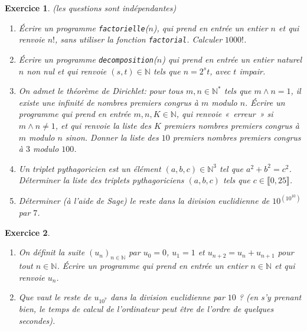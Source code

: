 \documentclass[11pt,a4paper]{article}
\newtheorem{ex}{Exercice}
\newcommand{\N}{\mathbb{N}}
\begin{document}
\begin{ex}(les   questions sont indépendantes)

\begin{enumerate}

\item Écrire un programme \texttt{factorielle}($n$), qui prend en entrée un entier $n$ et qui renvoie $n!$, sans utiliser la fonction \texttt{factorial}. Calculer $1000!$.



\item Écrire un programme \texttt{decomposition}($n$) qui prend en entrée un entier naturel $n$ non nul et qui renvoie $(s,t)\in \N$ tels que $n=2^s t$, avec $t$ impair.


\item On admet le théorème de Dirichlet: pour tous $m,n\in \N^*$ tels que $m\wedge n =1$, il existe une infinité de nombres premiers congrus à $m$ modulo $n$. Écrire un programme qui prend en entrée $m,n,K\in \N$, qui renvoie «~erreur~» si $m\wedge n\neq 1$, et qui renvoie la liste des $K$ premiers nombres premiers congrus à $m$ modulo $n$ sinon. Donner la liste des $10$ premiers nombres premiers congrus à $3$ modulo $100$.

\item Un triplet pythagoricien est un élément $(a,b,c)\in \N^3$ tel que $a^2+b^2=c^2$. Déterminer la liste des triplets pythagoriciens $(a,b,c)$ tels que $c\in \llbracket 0,25\rrbracket$.




\item Déterminer (à l'aide de Sage) le reste dans la division euclidienne de $10^{(10^{10})}$ par $7$.


\end{enumerate}
\end{ex}


\begin{ex}
\begin{enumerate}
\item On définit la suite $(u_n)_{n\in \N}$ par $u_0=0$, $u_1=1$ et $u_{n+2}=u_n+u_{n+1}$ pour tout $n\in \N$. Écrire un programme qui prend en entrée un entier $n\in \N$ et qui renvoie $u_n$. 

\item Que vaut le reste de $u_{10^7}$ dans la division euclidienne par $10$ ? (en s'y prenant bien, le temps de calcul de l'ordinateur peut être de l'ordre de quelques secondes).
\end{enumerate}
\end{ex}
\end{document}
